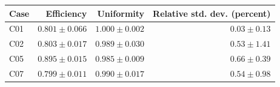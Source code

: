 \begin{tabular}{@{}lrrr@{}}
\toprule
Case & Efficiency & Uniformity & Relative std. dev. (percent) \\
\midrule
C01 & $0.801\pm0.066$ & $1.000\pm0.002$ & $0.03\pm0.13$ \\
C02 & $0.803\pm0.017$ & $0.989\pm0.030$ & $0.53\pm1.41$ \\
C05 & $0.895\pm0.015$ & $0.985\pm0.009$ & $0.66\pm0.39$ \\
C07 & $0.799\pm0.011$ & $0.990\pm0.017$ & $0.54\pm0.98$ \\
\bottomrule
\end{tabular}
